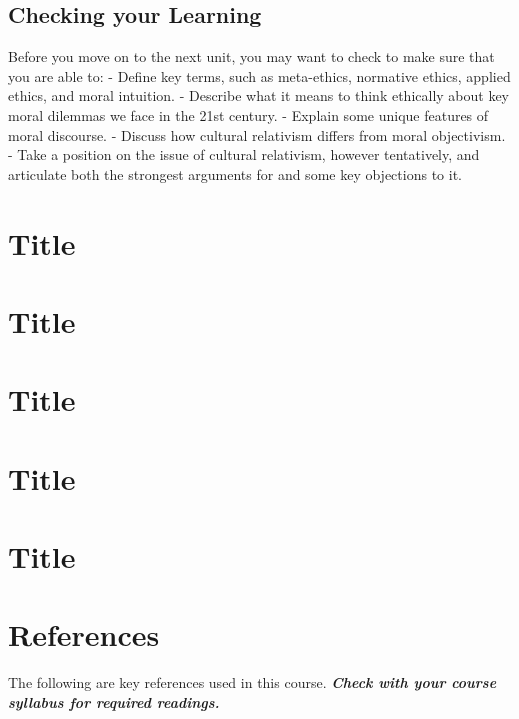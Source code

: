 \documentclass[
]{book}
\begin{document}
\hypertarget{checking-your-learning-1}{%
\section{Checking your Learning}\label{checking-your-learning-1}}

Before you move on to the next unit, you may want to check to make sure that you are able to:
- Define key terms, such as meta-ethics, normative ethics, applied ethics, and moral intuition.
- Describe what it means to think ethically about key moral dilemmas we face in the 21st century.
- Explain some unique features of moral discourse.
- Discuss how cultural relativism differs from moral objectivism.
- Take a position on the issue of cultural relativism, however tentatively, and articulate both the strongest arguments for and some key objections to it.

\hypertarget{title}{%
\chapter{Title}\label{title}}

\hypertarget{title-1}{%
\chapter{Title}\label{title-1}}

\hypertarget{title-2}{%
\chapter{Title}\label{title-2}}

\hypertarget{title-3}{%
\chapter{Title}\label{title-3}}

\hypertarget{title-4}{%
\chapter{Title}\label{title-4}}

\hypertarget{references}{%
\chapter*{References}\label{references}}

The following are key references used in this course. \textbf{\emph{Check with your course syllabus for required readings.}}

  
\end{document}
